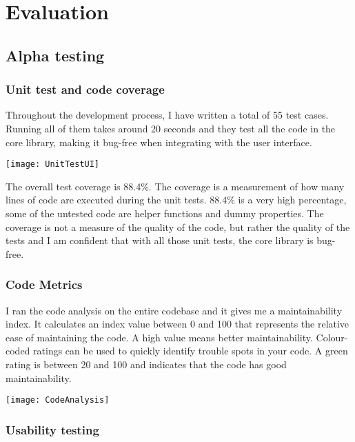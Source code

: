 \documentclass[report.tex]{subfiles}
\begin{document}
\chapter{Evaluation}

\section{Alpha testing}

\subsection{Unit test and code coverage}

Throughout the development process, I have written a total of 55 test cases. Running all of them takes around 20 seconds and they test all the code in the core library, making it bug-free when integrating with the user interface.

\texttt{[image: UnitTestUI]}

The overall test coverage is 88.4\%. The coverage is a measurement of how many lines of code are executed during the unit tests. 88.4\% is a very high percentage, some of the untested code are helper functions and dummy properties. The coverage is not a measure of the quality of the code, but rather the quality of the tests and I am confident that with all those unit tests, the core library is bug-free.

\subsection{Code Metrics}

I ran the code analysis on the entire codebase and it gives me a maintainability index. It calculates an index value between 0 and 100 that represents the relative ease of maintaining the code. A high value means better maintainability. Colour-coded ratings can be used to quickly identify trouble spots in your code. A green rating is between 20 and 100 and indicates that the code has good maintainability.\cite{microsoft:docs:code-metrics-maintainability-index-range-and-meaning}

\texttt{[image: CodeAnalysis]}

\subsection{Usability testing}
\end{document}
